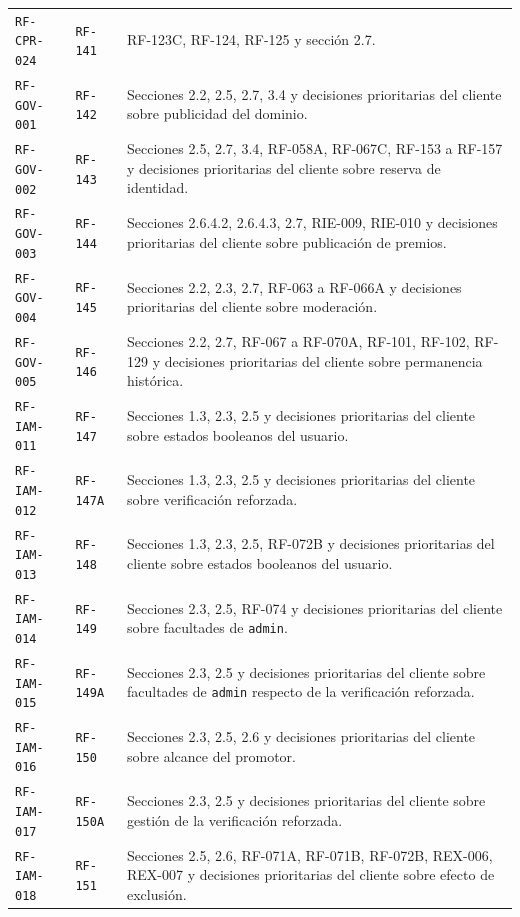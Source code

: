 \documentclass[10pt,letterpaper]{article}
\begin{document}
\begin{landscape}
\begin{longtable}{P{2.7cm}P{2.6cm}P{15.7cm}}
\texttt{RF-CPR-024} & \texttt{RF-141} & RF-123C, RF-124, RF-125 y sección 2.7.\\
\texttt{RF-GOV-001} & \texttt{RF-142} & Secciones 2.2, 2.5, 2.7, 3.4 y decisiones prioritarias del cliente sobre publicidad del dominio.\\
\texttt{RF-GOV-002} & \texttt{RF-143} & Secciones 2.5, 2.7, 3.4, RF-058A, RF-067C, RF-153 a RF-157 y decisiones prioritarias del cliente sobre reserva de identidad.\\
\texttt{RF-GOV-003} & \texttt{RF-144} & Secciones 2.6.4.2, 2.6.4.3, 2.7, RIE-009, RIE-010 y decisiones prioritarias del cliente sobre publicación de premios.\\
\texttt{RF-GOV-004} & \texttt{RF-145} & Secciones 2.2, 2.3, 2.7, RF-063 a RF-066A y decisiones prioritarias del cliente sobre moderación.\\
\texttt{RF-GOV-005} & \texttt{RF-146} & Secciones 2.2, 2.7, RF-067 a RF-070A, RF-101, RF-102, RF-129 y decisiones prioritarias del cliente sobre permanencia histórica.\\
\texttt{RF-IAM-011} & \texttt{RF-147} & Secciones 1.3, 2.3, 2.5 y decisiones prioritarias del cliente sobre estados booleanos del usuario.\\
\texttt{RF-IAM-012} & \texttt{RF-147A} & Secciones 1.3, 2.3, 2.5 y decisiones prioritarias del cliente sobre verificación reforzada.\\
\texttt{RF-IAM-013} & \texttt{RF-148} & Secciones 1.3, 2.3, 2.5, RF-072B y decisiones prioritarias del cliente sobre estados booleanos del usuario.\\
\texttt{RF-IAM-014} & \texttt{RF-149} & Secciones 2.3, 2.5, RF-074 y decisiones prioritarias del cliente sobre facultades de \texttt{admin}.\\
\texttt{RF-IAM-015} & \texttt{RF-149A} & Secciones 2.3, 2.5 y decisiones prioritarias del cliente sobre facultades de \texttt{admin} respecto de la verificación reforzada.\\
\texttt{RF-IAM-016} & \texttt{RF-150} & Secciones 2.3, 2.5, 2.6 y decisiones prioritarias del cliente sobre alcance del promotor.\\
\texttt{RF-IAM-017} & \texttt{RF-150A} & Secciones 2.3, 2.5 y decisiones prioritarias del cliente sobre gestión de la verificación reforzada.\\
\texttt{RF-IAM-018} & \texttt{RF-151} & Secciones 2.5, 2.6, RF-071A, RF-071B, RF-072B, REX-006, REX-007 y decisiones prioritarias del cliente sobre efecto de exclusión.\\

\end{longtable}
\end{landscape}
\end{document}
